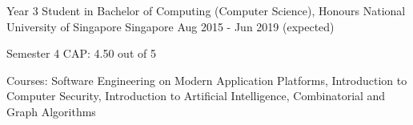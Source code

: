 

\begin{cventries}

  \cventry
  {Year 3 Student in Bachelor of Computing (Computer Science), Honours} %
  {National University of Singapore} %
  {Singapore} %
  {Aug 2015 - Jun 2019 (expected)} %
  {
    \begin{cvitems} %
    \item {Semester 4 CAP: 4.50 out of 5}
    \item {Courses: Software Engineering on Modern Application Platforms, Introduction to Computer Security, Introduction to Artificial Intelligence, Combinatorial and Graph Algorithms}
    \end{cvitems}
  }

\end{cventries}
